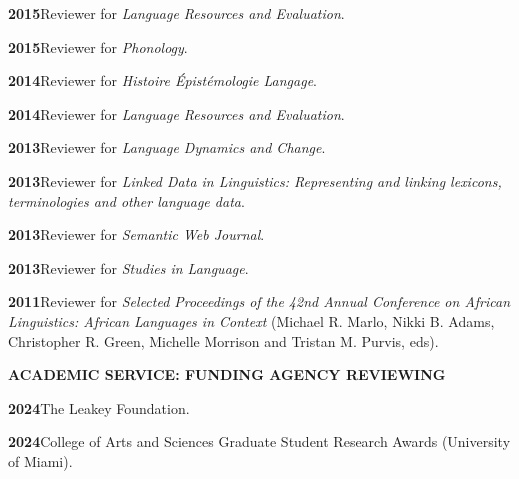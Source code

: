 \documentclass[11pt]{article}
\newcommand{\hangpara}{
 \setlength{\parindent}{0in} %
 \hangindent=0.42in %
}
\begin{document}

\vskip 6pt
\hangpara
{\bf 2015}\hspace{1ex}Reviewer for \textit{Language Resources and Evaluation}.

\vskip 6pt
\hangpara
{\bf 2015}\hspace{1ex}Reviewer for \textit{Phonology}.

\vskip 6pt
\hangpara
{\bf 2014}\hspace{1ex}Reviewer for \textit{Histoire {\'E}pist{\'e}mologie Langage}.

\vskip 6pt
\hangpara
{\bf 2014}\hspace{1ex}Reviewer for \textit{Language Resources and Evaluation}.

\vskip 6pt
\hangpara
{\bf 2013}\hspace{1ex}Reviewer for \textit{Language Dynamics and Change}.

\vskip 6pt
\hangpara
{\bf 2013}\hspace{1ex}Reviewer for \textit{Linked Data in Linguistics: Representing and linking lexicons, terminologies and other language data}.

\vskip 6pt
\hangpara
{\bf 2013}\hspace{1ex}Reviewer for \textit{Semantic Web Journal}.

\vskip 6pt
\hangpara
{\bf 2013}\hspace{1ex}Reviewer for \textit{Studies in Language}.

\vskip 6pt
\hangpara
{\bf 2011}\hspace{1ex}Reviewer for \textit{Selected Proceedings of the 42nd Annual Conference on African Linguistics: African Languages in Context} (Michael R. Marlo, Nikki B. Adams, Christopher R. Green, Michelle Morrison and Tristan M. Purvis, eds).

\vskip 20pt
\begin{flushleft}
{\bf ACADEMIC SERVICE: FUNDING AGENCY REVIEWING}
\end{flushleft}

\hangpara
{\bf 2024}\hspace{1ex}The Leakey Foundation.

\vskip 6pt
\hangpara
{\bf 2024}\hspace{1ex}College of Arts and Sciences Graduate Student Research Awards (University of Miami).
\end{document}
